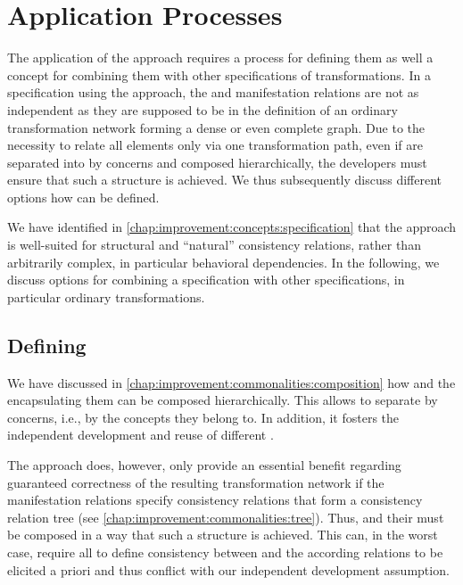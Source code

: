 \section{Application Processes}
\label{chap:improvement:application}

The application of the \commonalities approach requires a process for defining them as well a concept for combining them with other specifications of transformations.
In a specification using the \commonalities approach, the \conceptmetamodels and manifestation relations are not as independent as they are supposed to be in the definition of an ordinary transformation network forming a dense or even complete graph.
Due to the necessity to relate all elements only via one transformation path, even if \commonalities are separated into \conceptmetamodels by concerns and composed hierarchically, the developers must ensure that such a structure is achieved.
We thus subsequently discuss different options how \commonalities can be defined.

We have identified in \autoref{chap:improvement:concepts:specification} that the \commonalities approach is well-suited for structural and \enquote{natural} consistency relations, rather than arbitrarily complex, in particular behavioral dependencies.
In the following, we discuss options for combining a \commonalities specification with other specifications, in particular ordinary transformations.


\subsection{Defining \Commonalities}

We have discussed in \autoref{chap:improvement:commonalities:composition} how \commonalities and the \conceptmetamodels encapsulating them can be composed hierarchically.
This allows to separate \commonalities by concerns, i.e., by the concepts they belong to.
In addition, it fosters the independent development and reuse of different \conceptmetamodels.

The \commonalities approach does, however, only provide an essential benefit regarding guaranteed correctness of the resulting transformation network if the manifestation relations specify consistency relations that form a consistency relation tree (see \autoref{chap:improvement:commonalities:tree}).
Thus, \commonalities and their \conceptmetamodels must be composed in a way that such a structure is achieved.
This can, in the worst case, require all \concretemetamodels to define consistency between and the according relations to be elicited a priori and thus conflict with our independent development assumption.

